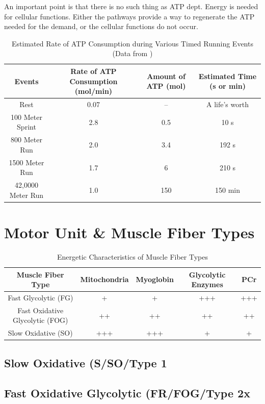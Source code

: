An important point is that there is no such thing as ATP dept. Energy is needed for cellular functions. Either the pathways provide a way to regenerate the ATP needed for the demand, or the cellular functions do not occur.


\begin{table}[h!]
\centering
\begin{tabular}{||c c c c||} 
 \hline
Events & Rate of ATP Consumption (mol/min) & Amount of ATP (mol) & Estimated Time (s or min)\\ [0.5ex] 
 \hline\hline
 Rest & 0.07  & -- & A life's worth \\
 100 Meter Sprint & 2.8 & 0.5 & 10 s \\ 
 800 Meter Run & 2.0 & 3.4 & 192 s\\
 1500 Meter Run & 1.7 & 6 & 210 s \\ 
 42,0000 Meter Run & 1.0 & 150 & 150 min \\[1ex] 
 \hline
\end{tabular}
\caption{Estimated Rate of ATP Consumption during Various Timed Running Events (\footnotesize{Data from \cite{feher_quantitative_2017}})}
\label{table:Event_ATP_Rates}
\end{table}


\section{Motor Unit \& Muscle Fiber Types}

\begin{table}[h!]
\centering
\begin{tabular}{||c c c c c||} 
 \hline
 Muscle Fiber Type & Mitochondria & Myoglobin & Glycolytic Enzymes & PCr \\ [0.5ex] 
 \hline\hline
 Fast Glycolytic (FG)  & + & + & +++ & +++ \\ 
 Fast Oxidative Glycolytic (FOG) & ++ & ++ & ++ & ++ \\
 Slow Oxidative (SO) &  +++ & +++ & + & + \\ [1ex] 
 \hline
\end{tabular}
\caption{Energetic Characteristics of Muscle Fiber Types}
\label{table:Muscle_Fiber_Energetics}
\end{table}

\subsection{Slow Oxidative (S/SO/Type 1}

\subsection{Fast Oxidative Glycolytic (FR/FOG/Type 2x}

